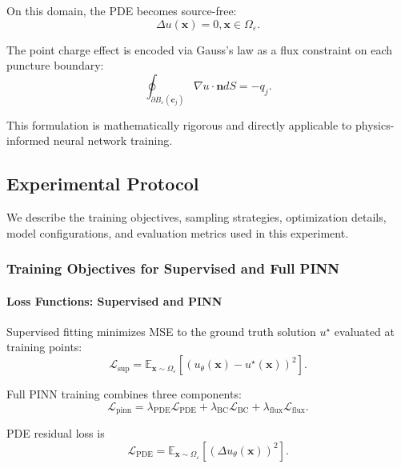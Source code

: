 \documentclass[twoside,11pt]{article}
\newcommand{\E}{\mathbb{E}}
\newcommand{\bx}{\bm{x}}
\newcommand{\bc}{\bm{c}}
\begin{document}
On this domain, the PDE becomes source-free:
\begin{equation}
	\Delta u(\bx) = 0, \bx \in \Omega_\varepsilon.
\end{equation}

The point charge effect is encoded via Gauss's law as a flux constraint on each puncture boundary:
\begin{equation}
	\oint_{\partial B_\varepsilon(\bc_j)} \nabla u \cdot \mathbf{n} dS = -q_j.
	\label{eq:gauss_flux}
\end{equation}

This formulation is mathematically rigorous and directly applicable to physics-informed neural network training.

\subsection{Experimental Protocol}

We describe the training objectives, sampling strategies, optimization details, model configurations, and evaluation metrics used in this experiment.

\subsubsection{Training Objectives for Supervised and Full PINN}

\paragraph{Loss Functions: Supervised and PINN}

Supervised fitting minimizes MSE to the ground truth solution $u^\star$ evaluated at training points:
\begin{equation}
	\mathcal{L}_{\text{sup}} = \E_{\bx \sim \Omega_\varepsilon}\left[(u_\theta(\bx) - u^\star(\bx))^2\right].
\end{equation}

Full PINN training combines three components:
\begin{equation}
	\mathcal{L}_{\text{pinn}} = \lambda_{\text{PDE}} \mathcal{L}_{\text{PDE}} + \lambda_{\text{BC}} \mathcal{L}_{\text{BC}} + \lambda_{\text{flux}} \mathcal{L}_{\text{flux}}.
\end{equation}

PDE residual loss is
\begin{equation}
	\mathcal{L}_{\text{PDE}} = \E_{\bx \sim \Omega_\varepsilon}\left[(\Delta u_\theta(\bx))^2\right].
\end{equation}
\end{document}

